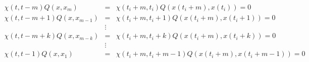 \documentclass[]{article}
\newcommand{\bc}{\begin{cases}}
\newcommand{\ec}{\end{cases}}
\def\cut#1{{}}
\begin{document}
\begin{eqnarray}
\chi(t, t-m) Q(x, x_m) &=& \chi(t_i+m,t_i) Q(x(t_i+m), x(t_i)) = 0 \\
\chi(t, t-m+1) Q(x, x_{m-1}) &=& \chi(t_i+m,t_i+1) Q(x(t_i+m), x(t_i+1)) = 0 \\
&\vdots&\\
\chi(t, t-m+k) Q(x, x_{m-k}) &=& \chi(t_i+m,t_i+k) Q(x(t_i+m), x(t_i+k)) = 0 \\
&\vdots&\\
\chi(t, t-1) Q(x, x_1) &=& \chi(t_i+m,t_i+m-1) Q(x(t_i+m), x(t_i+m-1)) = 0 
\end{eqnarray}
\cut{with, for $t \ge t_i+m$
\begin{eqnarray}
x_m(t+1) = x_{m-1}(t) &~~~~& x_m(t_i+m) = x(t_i) \\ 
x_{m-1}(t+1) = x_{m-2}(t) &~~~~& x_{m-2}(t_i+m) = x(t_i+1) \\ 
& \vdots & \\
x_2(t+1) = x_1(t)  &~~~~& x_{2}(t_i+m) = x(t_i+m-2) \\ 
x_1(t+1) = x(t)  &~~~~& x_{1}(t_i+m) = x(t_i+m-1) \\
\dot x = f(x) + c(x) u & ~~~~& x(t_i+m) = x(t_i+m)
\end{eqnarray}
\begin{equation}
x_0(t+1) = f(x_0) + g(x_0) u_0
\end{equation}
Then at time $t+1$ the measurement $y_1 = y(t+1)$ becomes available, as well as the input $u(t+1)$, so 
\begin{equation}
\bc
x_0(t+1) = x_1(t) \\
x_1(t+1) = f(x_1) + g(x_1) u(t+1) \\
\chi(y_1,y_0)Q(x_1,x_0) = n_1
\ec
\end{equation}
where we indicate with $Q(x_1,x_0) = Q(t+1,t)$. Then at time $t+2$ we have
\begin{equation}
\bc
x_0(t+1) = x_1(t) \\
x_1(t+1) = x_2(t) \\
x_2(t+1) = f(x_2) + g(x_2) u(t+2) \\
\chi(y_1,y_0)Q(x_1,x_0) = n_1 \\
\chi(y_2,y_0)Q(x_2,x_0) = n_2 
\ec
\end{equation}
and at time $t+k$
\begin{equation}
\bc
x_0(t+1) = x_1(t) \\
x_1(t+1) = x_2(t) \\
~~~ \vdots \\
x_{k-1}(t+1) = x_k(t) \\

\end{equation}}
\end{document}
